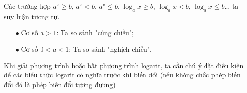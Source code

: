 \begin{luuy}
	Các trường hợp $a^x \ge b$, $a^x<b$, $a^x \le b$, $\log_ax \ge b$, $\log_ax < b$, $\log_ax \le b$... ta suy luận tương tự.
		\begin{itemize}
			\item [$\bullet$] Cơ số $a> 1$: Ta so sánh "cùng chiều";
			\item [$\bullet$] Cơ số $0<a<1$: Ta so sánh "nghịch chiều".
		\end{itemize}
\begin{note}
	Khi giải phương trình hoặc bất phương trình logarit, ta cần chú ý đặt điều kiện để các biểu thức logarit có nghĩa trước khi biến đổi (nếu không chắc phép biến đổi đó là phép biến đổi tương đương)
\end{note}
\end{luuy}